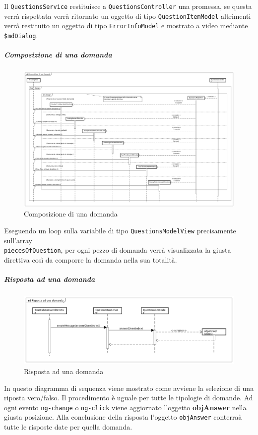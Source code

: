 Il \texttt{QuestionsService} restituisce a \texttt{QuestionsController} una promessa, se questa verrà rispettata verrà ritornato un oggetto di tipo \texttt{QuestionItemModel} altrimenti verrà restituito un oggetto di tipo \texttt{ErrorInfoModel} e mostrato a video mediante \texttt{\$mdDialog}.


\subparagraph{Composizione di una domanda}

\label{Composizione di una domanda}

\begin{figure}[ht]
	\centering
	\includegraphics[scale=0.25,keepaspectratio]{UML/DiagrammiDiSequenza/Front-end/Training_makingAQuestion.png}
	\caption{Composizione di una domanda}
\end{figure} \FloatBarrier

Eseguendo un loop sulla variabile di tipo \texttt{QuestionsModelView} precisamente sull'array \\ \texttt{piecesOfQuestion}, per ogni pezzo di domanda verrà visualizzata la giusta direttiva così da comporre la domanda nella sua totalità.

\subparagraph{Risposta ad una domanda}

\label{Risposta ad una domanda}

\begin{figure}[ht]
	\centering
	\includegraphics[scale=0.4,keepaspectratio]{UML/DiagrammiDiSequenza/Front-end/Training_answerAQuestion.png}
	\caption{Risposta ad una domanda}
\end{figure} \FloatBarrier

In questo diagramma di sequenza viene mostrato come avviene la selezione di una riposta vero/falso. Il procedimento è uguale per tutte le tipologie di domande. Ad ogni evento \texttt{ng-change} o \texttt{ng-click} viene aggiornato l'oggetto \textbf{objAnswer} nella giusta posizione. Alla conclusione della risposta l'oggetto \texttt{objAnswer} conterraà tutte le risposte date per quella domanda. 
